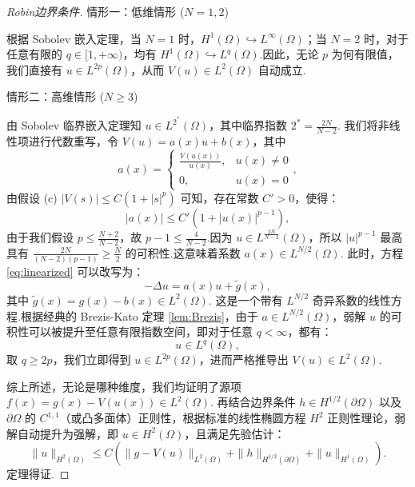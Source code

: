 \begin{proof}[Robin边界条件]
{\heiti 情形一：低维情形 ($N = 1, 2$)}

根据 Sobolev 嵌入定理，当 $N=1$ 时，$H^1(\Omega) \hookrightarrow L^\infty(\Omega)$；当 $N=2$ 时，对于任意有限的 $q \in [1, +\infty)$，均有 $H^1(\Omega) \hookrightarrow L^q(\Omega)$.因此，无论 $p$ 为何有限值，我们直接有 $u \in L^{2p}(\Omega)$，从而 $V(u) \in L^2(\Omega)$ 自动成立.

{\heiti 情形二：高维情形 ($N \ge 3$)}

由 Sobolev 临界嵌入定理知 $u \in L^{2^*}(\Omega)$，其中临界指数 $2^* = \frac{2N}{N-2}$.
我们将非线性项进行代数重写，令 $V(u) = a(x)u + b(x)$，其中
$$a(x) = \begin{cases} \frac{V(u(x))}{u(x)}, & u(x) \neq 0 \\ 0, & u(x) = 0 \end{cases},$$
由假设 (c) $|V(s)| \le C(1 + |s|^p)$ 可知，存在常数 $C' > 0$，使得：
$$|a(x)| \le C'(1 + |u(x)|^{p-1}),$$
由于我们假设 $p \le \frac{N+2}{N-2}$，故 $p-1 \le \frac{4}{N-2}$.因为 $u \in L^{\frac{2N}{N-2}}(\Omega)$，所以 $|u|^{p-1}$ 最高具有 $\frac{2N}{(N-2)(p-1)} \ge \frac{N}{2}$ 的可积性.这意味着系数 $a(x) \in L^{N/2}(\Omega)$.
此时，方程 \eqref{eq:linearized} 可以改写为：
$$-\Delta u = a(x)u + \tilde{g}(x),$$
其中 $\tilde{g}(x) = g(x) - b(x) \in L^2(\Omega)$.
这是一个带有 $L^{N/2}$ 奇异系数的线性方程.根据经典的 Brezis-Kato 定理 \ref{lem:Brezis}，由于 $a \in L^{N/2}(\Omega)$，弱解 $u$ 的可积性可以被提升至任意有限指数空间，即对于任意 $q < \infty$，都有：
$$u \in L^q(\Omega),$$
取 $q \ge 2p$，我们立即得到 $u \in L^{2p}(\Omega)$，进而严格推导出 $V(u) \in L^2(\Omega)$.

综上所述，无论是哪种维度，我们均证明了源项 $f(x) = g(x) - V(u(x)) \in L^2(\Omega)$.
再结合边界条件 $h \in H^{1/2}(\partial \Omega)$ 以及 $\partial \Omega$ 的 $C^{1,1}$（或凸多面体）正则性，根据标准的线性椭圆方程 $H^2$ 正则性理论，弱解自动提升为强解，即 $u \in H^2(\Omega)$，且满足先验估计：
$$\|u\|_{H^2(\Omega)} \le C \left( \|g - V(u)\|_{L^2(\Omega)} + \|h\|_{H^{1/2}(\partial \Omega)} + \|u\|_{H^1(\Omega)} \right).$$
定理得证.
\end{proof}

